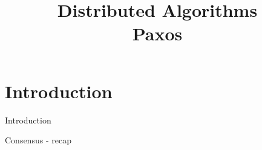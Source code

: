 
\title[DS - Paxos]{\textbf{Distributed Algorithms}\\Paxos}






\begin{frame}
\titlepage


\end{frame}




\section{Introduction}

\begin{frame}{Introduction}
	
\begin{block}{Consensus - recap}	

	
\end{block}
	
\end{frame}


